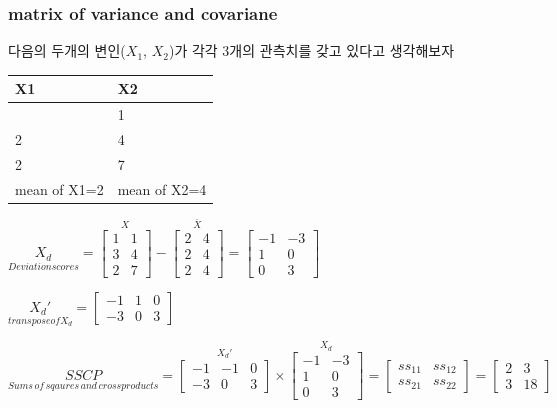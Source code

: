 \documentclass[
]{book}
\begin{document}
\subsubsection{matrix of variance and covariane}\label{matrix-of-variance-and-covariane}

다음의 두개의 변인(\(X_{1}\), \(X_{2}\))가 각각 3개의 관측치를 갖고 있다고 생각해보자

\begin{longtable}[]{@{}ll@{}}
\toprule\noalign{}
X1 & X2 \\
\midrule\noalign{}
\endhead
\bottomrule\noalign{}
\endlastfoot
1 & 1 \\
2 & 4 \\
2 & 7 \\
mean of X1=2 & mean of X2=4 \\
\end{longtable}

\(\underset{Deviation scores}{X_{d}}=\overset{X}{\begin{bmatrix}
1 & 1\\
3 & 4\\
2 & 7
\end{bmatrix}}-\overset{\bar{X}}{\begin{bmatrix}
 2& 4\\
 2& 4\\
 2& 4
\end{bmatrix}}=\begin{bmatrix}
-1 & -3\\
 1&0 \\
 0&3
\end{bmatrix}\)

\(\underset{transpose of X_{d}}{{X_{d}}'}=\begin{bmatrix}
-1 & 1 & 0\\
-3 & 0 & 3
\end{bmatrix}\)

\(\underset{Sums\, of\, sqaures\, and\, crossproducts}{SSCP}=\overset{{X_{d}}'}{\begin{bmatrix}
-1 & -1 & 0\\
-3 & 0 & 3
\end{bmatrix}}\times \overset{X_{d}}{\begin{bmatrix}
-1 & -3\\
1 &0 \\
0 &3
\end{bmatrix}}=\begin{bmatrix}
ss_{11} & ss_{12}\\
ss_{21} & ss_{22}
\end{bmatrix}=\begin{bmatrix}
2 &3 \\
3 &18
\end{bmatrix}\)
\end{document}
